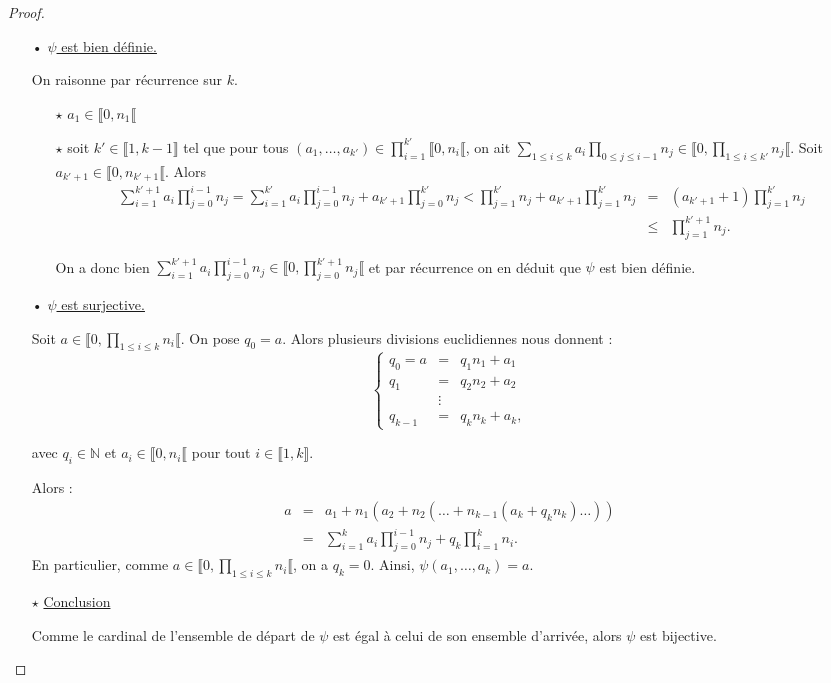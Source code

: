 \documentclass[12pt]{report}
\newcommand{\N}{\mathbb{N}}
\begin{document}
\begin{proof}\
\begin{itemize}
\item[•] \underline{$\psi$ est bien définie.}\par 
On raisonne par récurrence sur $k$.
\begin{itemize}
\item[$\star$] $a_1 \in \llbracket 0,n_1 \llbracket $
\item[$\star$]soit  $k'\in \llbracket 1,k-1\rrbracket$ tel que  pour tous $(a_1,\ldots,a_{k'})\in \prod_{i=1}^{k'} \llbracket 0,n_i\llbracket $, on ait   $\sum_{1 \leq i \leq k }a_i \prod_{0 \leq j \leq i-1}n_j \in \llbracket 0, \prod_{1 \leq i \leq  k'}n_j \llbracket  $. Soit $a_{k'+1}\in \llbracket 0,n_{k'+1}\llbracket$. Alors 
\begin{eqnarray*}   
 \sum_{ i=1}^{ k'+1 }a_i \prod_{j=0}^{ i-1}n_j=  \sum_{ i=1}^{ k' }a_i \prod_{j=0}^{ i-1}n_j +a_{k'+1}\prod_{j=0}^{k'} n_j < \prod_{ j=1}^{ k'}n_j + a_{k'+1}    \prod_{ j=1}^{k'}n_j &=& (a_{k'+1}+1)  \prod_{ j=1}^{ k'}n_j \\
           & \leq  & \prod_{ j=1}^{ k'+1} n_j .
\end{eqnarray*} 

On a donc bien $ \sum_{ i=1}^{ k'+1 }a_i \prod_{j=0}^{ i-1}n_j\in \llbracket 0,\prod_{j=0}^{k'+1} n_j\llbracket$ et par récurrence on en déduit que $\psi$ est bien définie. 
 
\end{itemize}
\item[•]\underline{$\psi$ est surjective.} \par 
Soit $a \in \llbracket 0, \prod_{1 \leq i \leq k }n_i\llbracket$. On pose $q_0 =a$. Alors plusieurs divisions euclidiennes nous donnent :
\begin{equation*}
\left \{ \begin{array}{lcr}
q_0=a&=& q_1 n_1 +a_1 \\
q_1 &=& q_2 n_2 +a_2\\
& \vdots &      \\
q_{k-1} &=& q_k n_k +a_k,
\end{array} \right.
\end{equation*}
 
 avec $q_i\in \N$ et $a_i\in \llbracket 0,n_i\llbracket$ pour tout $i\in \llbracket 1,k\rrbracket$. 

Alors :
 \begin{eqnarray*}
a &=& a_1 +  n_1 (  a_2 + n_2 (\ldots +n_{k-1}(a_k+q_k n_k) \ldots ))\\ 
  &=& \sum_{i=1}^k a_i \prod_{j=0}^{i-1} n_j + q_k \prod_{i=1}^k n_i.
\end{eqnarray*}
En particulier, comme $a \in \llbracket 0, \prod_{1 \leq i \leq k}n_i \llbracket$, on a  $q_k=0$. Ainsi, $\psi(a_1, \ldots, a_k)=a$.
\item[$\star$] \underline{Conclusion}\par 
Comme le cardinal de l'ensemble de départ de $\psi$ est égal à celui de son ensemble d'arrivée, alors $\psi$ est bijective.
\end{itemize}
\end{proof}
 
\end{document}
